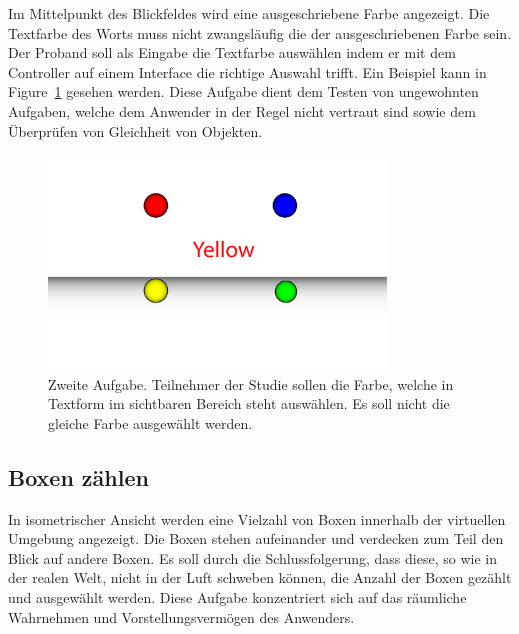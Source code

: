 Im Mittelpunkt des Blickfeldes wird eine ausgeschriebene Farbe angezeigt. Die Textfarbe des Worts muss nicht zwangsläufig die der ausgeschriebenen Farbe sein. 
Der Proband soll als Eingabe die Textfarbe auswählen indem er mit dem Controller auf einem Interface die richtige Auswahl trifft. Ein Beispiel kann in Figure~\ref{fig:matching_abstract} gesehen werden. 
Diese Aufgabe dient dem Testen von ungewohnten Aufgaben, welche dem Anwender in der Regel nicht vertraut sind sowie dem Überprüfen von Gleichheit von Objekten.

\begin{figure}[H]
	\centering
	\includegraphics[width=0.8\textwidth]{./images/matching_abstract.png}
	\caption{Zweite Aufgabe. Teilnehmer der Studie sollen die Farbe, welche in Textform im sichtbaren Bereich steht auswählen. Es soll nicht die gleiche Farbe ausgewählt werden.}
	\label{fig:matching_abstract}
\end{figure}

\subsection{Boxen zählen} 

In isometrischer Ansicht werden eine Vielzahl von Boxen innerhalb der virtuellen Umgebung angezeigt. 
Die Boxen stehen aufeinander und verdecken zum Teil den Blick auf andere Boxen. Es soll durch die Schlussfolgerung, dass diese, so wie in der realen Welt, nicht in der Luft schweben können, die Anzahl der Boxen gezählt und ausgewählt werden. 
Diese Aufgabe konzentriert sich auf das räumliche Wahrnehmen und Vorstellungsvermögen des Anwenders.

